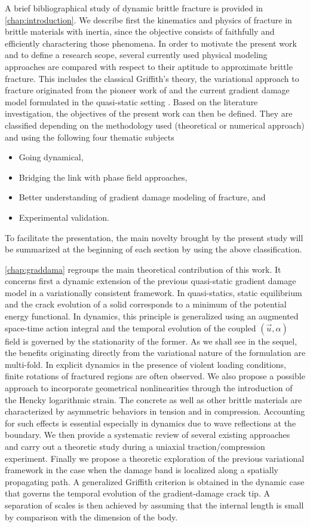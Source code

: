 A brief bibliographical study of dynamic brittle fracture is provided in \cref{chap:introduction}. We describe first the kinematics and physics of fracture in brittle materials with inertia, since the objective consists of faithfully and efficiently charactering those phenomena. In order to motivate the present work and to define a research scope, several currently used physical modeling approaches are compared with respect to their aptitude to approximate brittle fracture. This includes the classical Griffith's theory, the variational approach to fracture originated from the pioneer work of \cite{FrancfortMarigo:1998} and the current gradient damage model formulated in the quasi-static setting \cite{PhamMarigo:2010-1}. Based on the literature investigation, the objectives of the present work can then be defined. They are classified depending on the methodology used (theoretical or numerical approach) and using the following four thematic subjects
\begin{itemize}
\item Going dynamical,
\item Bridging the link with phase field approaches,
\item Better understanding of gradient damage modeling of fracture, and
\item Experimental validation.
\end{itemize}
To facilitate the presentation, the main novelty brought by the present study will be summarized at the beginning of each section by using the above classification.

\cref{chap:graddama} regroups the main theoretical contribution of this work. It concerns first a dynamic extension of the previous quasi-static gradient damage model in a variationally consistent framework. In quasi-statics, static equilibrium and the crack evolution of a solid corresponds to a minimum of the potential energy functional. In dynamics, this principle is generalized using an augmented space-time action integral and the temporal evolution of the coupled $(\vec{u},\alpha)$ field is governed by the stationarity of the former. As we shall see in the sequel, the benefits originating directly from the variational nature of the formulation are multi-fold. In explicit dynamics in the presence of violent loading conditions, finite rotations of fractured regions are often observed. We also propose a possible approach to incorporate geometrical nonlinearities through the introduction of the Hencky logarithmic strain. The concrete as well as other brittle materials are characterized by asymmetric behaviors in tension and in compression. Accounting for such effects is essential especially in dynamics due to wave reflections at the boundary. We then provide a systematic review of several existing approaches and carry out a theoretic study during a uniaxial traction/compression experiment. Finally we propose a theoretic exploration of the previous variational framework in the case when the damage band is localized along a spatially propagating path. A generalized Griffith criterion is obtained in the dynamic case that governs the temporal evolution of the gradient-damage crack tip. A separation of scales is then achieved by assuming that the internal length is small by comparison with the dimension of the body.

